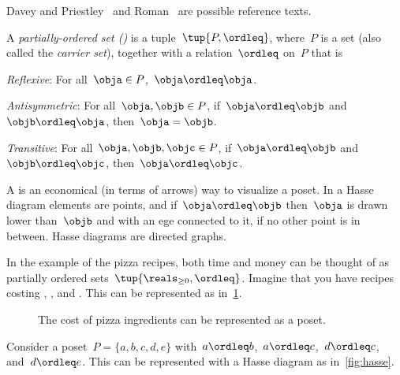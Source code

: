 Davey and Priestley~\cite{davey02}
and Roman~\cite{roman08} are possible reference texts.



\begin{definition}
    \label{def:poset}
    A \emph{partially-ordered set ()} is a tuple~$\tup{P,\ordleq}$,
    where~$P$ is a set (also called the \emph{carrier set}), together with a
    relation~$\ordleq$ on~$P$ that is
    \begin{compactenum}
        \item \emph{Reflexive}: For all~$\obja\in P$,~$\obja \ordleq \obja$.
        \item \emph{Antisymmetric}: For all~$\obja,\objb\in P$, if~$\obja\ordleq \objb$ and~$\objb\ordleq \obja$, then~$\obja=\objb$.
        \item \emph{Transitive}: For all~$\obja,\objb,\objc\in P$, if~$\obja\ordleq \objb$ and~$\objb\ordleq \objc$, then~$\obja\ordleq \objc$.
    \end{compactenum}
\end{definition}

A \emph{} is an economical (in terms of arrows) way to visualize a poset. In a Hasse diagram elements are points, and if~$\obja \ordleq \objb$ then~$\obja$ is drawn lower than~$\objb$ and with an ege connected to it, if no other point is in between. Hasse diagrams are directed graphs.

In the example of the pizza recipes, both time and money can be thought of as partially ordered sets~$\tup{\reals_{\geq 0},\ordleq}$. Imagine that you have recipes costing \unit[1]{\USD}, \unit[2]{\USD}, and \unit[3]{\USD}. This can be represented as in~\cref{fig:hassepizza}.

\begin{figure}[h!]
    \begin{center}
        \caption{The cost of pizza ingredients can be represented as a poset.\label{fig:hassepizza}}
    \end{center}
\end{figure}


\begin{example}
    Consider a poset~$P=\{a,b,c,d,e\}$ with~$a\ordleq b$,~$a\ordleq c$,~$d\ordleq c$, and~$d\ordleq e$. This can be represented with a Hasse diagram as in~\cref{fig:hasse}.
\end{example}

